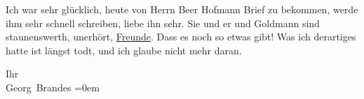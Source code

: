 \pstart
           Ich war sehr glücklich, heute von Herrn Beer
                  Hofmann Brief zu bekommen, werde ihm sehr schnell schreiben, liebe ihn sehr.
               Sie und er und Goldmann sind staunenswerth,
               unerhört, \uline{Freunde}. Dass es noch so etwas gibt! Was
               ich derartiges hatte ist längst todt, und ich glaube nicht mehr daran.\pend
           
\pstart
           Ihr{\\[\baselineskip]}\spacefill\mbox{Georg Brandes}\pend
           \leftskip=0em{}\endnumbering{}  \newcommand{\dateiname}{L00639}\newcommand{\titel}{Georg Brandes an Arthur Schnitzler, 16. 1. 1897}\newcommand{\editorInnen}{Martin Anton Müller und Gerd-Hermann Susen}
